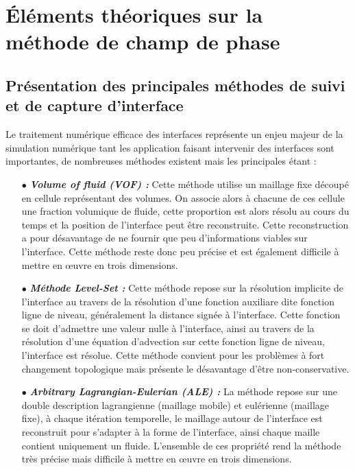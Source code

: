 \chapter{Éléments théoriques sur la méthode de champ de phase}
\section{Présentation des principales méthodes de suivi et de capture d'interface}

Le traitement numérique efficace des interfaces représente un enjeu majeur de la simulation numérique tant les application faisant intervenir des interfaces sont importantes, de nombreuses méthodes existent mais les principales étant :
\begin{itemize}
	\item[$\bullet$] \textit{\textbf{Volume of fluid (VOF) : }} Cette méthode utilise un maillage fixe découpé en cellule représentant des volumes. On associe alors à chacune de ces cellule une fraction volumique de fluide, cette proportion est alors résolu au cours du temps et la position de l'interface peut être reconstruite. Cette reconstruction a pour désavantage de ne fournir que peu d'informations viables sur l'interface. Cette méthode reste donc peu précise et est également difficile à mettre en \oe uvre en trois dimensions.
	\item[$\bullet$] \textit{\textbf{Méthode Level-Set : }}	Cette méthode repose sur la résolution implicite de l'interface au travers de la résolution d'une fonction auxiliare dite fonction ligne de niveau, généralement la distance signée à l'interface. Cette fonction se doit d'admettre une valeur nulle à l'interface, ainsi au travers de la résolution d'une équation d'advection sur cette fonction ligne de niveau, l'interface est résolue. Cette méthode convient pour les problèmes à fort changement topologique mais présente le désavantage d'être non-conservative.
	\item[$\bullet$]\textit{ \textbf{Arbitrary Lagrangian-Eulerian (ALE) : }} La méthode repose sur une double description lagrangienne (maillage mobile) et eulérienne (maillage fixe), à chaque itération temporelle, le maillage autour de l'interface est reconstruit pour s'adapter à la forme de l'interface, ainsi chaque maille contient uniquement un fluide. L'ensemble de ces propriété rend la méthode très précise mais difficile à mettre en \oe uvre en trois dimensions.
\end{itemize}








